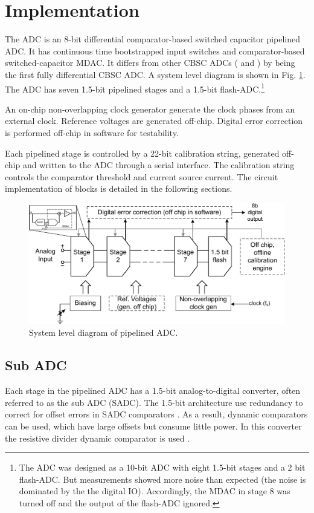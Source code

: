 \section{Implementation}\label{cbsccircuit}
The ADC is an 8-bit differential comparator-based switched
capacitor pipelined ADC. It has continuous time bootstrapped input
switches and comparator-based switched-capacitor MDAC. It differs
from other CBSC ADCs (\cite{brooks07} and \cite{sepke06}) by
being the first fully differential CBSC ADC. A system level diagram is
shown in Fig. \ref{cbscfig:system}. The ADC has seven 1.5-bit pipelined
stages and a 1.5-bit flash-ADC.\footnote{The ADC was
  designed as a 10-bit ADC with eight 1.5-bit stages and a 2 bit flash-ADC. But 
  measurements showed more noise than expected (the noise is dominated
  by the the digital IO). Accordingly, the MDAC in stage 8
  was turned off and the output of the flash-ADC ignored.}

 An on-chip non-overlapping
clock generator generate the clock phases from an external clock. Reference voltages are
generated off-chip. Digital 
error correction is performed off-chip in software for testability. 

Each
pipelined stage is controlled by a 22-bit calibration string,
generated off-chip and written to the ADC through a serial
interface. The calibration string controls the comparator threshold
and current source current. The circuit implementation of blocks is detailed in the 
following sections.
\begin{figure}[htbp]
\centerline{ \includegraphics[width=\myfigwidthl]{graphics/scarabtop}}
  \caption{System level diagram of pipelined ADC.}
  \label{cbscfig:system}
\end{figure}


\subsection{Sub ADC}
Each stage in the pipelined ADC has a 1.5-bit analog-to-digital
converter, often referred to as the sub ADC (SADC). The 1.5-bit
architecture use redundancy to correct 
for offset errors in SADC comparators \cite{Lewis92}. As a result,
dynamic comparators can be used, which have large 
offsets but consume little power. In this
converter the resistive divider dynamic comparator is used \cite{cho95}.


